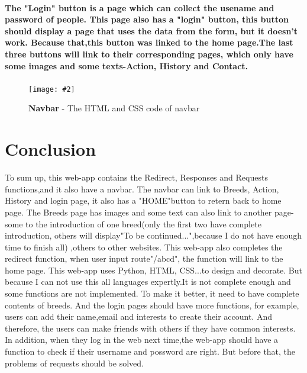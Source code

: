 \documentclass[10pt, a4paper]{article}
\newcommand{\figuremacro}[5]{
    \begin{figure}[#1]
        \centering
        \texttt{[image: \#2]}
        \caption[#3]{\textbf{#3}#4}
        \label{fig:#2}
    \end{figure}
}
\begin{document}
    \paragraph{The "Login" button is a page which can collect the usename and password of people. This page also has a "login" button, this button should display a page that uses the data from the form, but it doesn't work. Because that,this button was linked to the home page.The last three buttons will link to their corresponding pages, which only have some images and some texts-Action, History and Contact.}
    
     \figuremacro{h}{nav.JPG}{Navbar}{ - The HTML and CSS code of navbar}{1.0}
    
    
	
    
	
\section{Conclusion}
To sum up, this web-app contains the Redirect, Responses and Requests functions,and it also have a navbar. The navbar can link to Breeds, Action, History and login page, it also has a "HOME"button to retern back to home page. The Breeds page has images and some text can also link to another page-some to the introduction of one breed(only the first two have complete introduction, others will display"To be continued...",because I do not have enough time to finish all) ,others to other websites. This web-app also completes the redirect function, when user input route"/abcd", the function will link to the home page. This web-app uses Python, HTML, CSS...to design and decorate. But because I can not use this all languages expertly.It is not complete enough and some functions are not implemented. To make it better, it need to have complete contents of breeds. And the login pages should have more functions, for example, users can add their name,email and interests to create their account. And therefore, the users can make friends with others if they have common interests. In addition, when they log in the web next time,the web-app should have a function to check if their username and possword are right. But before that, the problems of requests should be solved.


		
\end{document}
